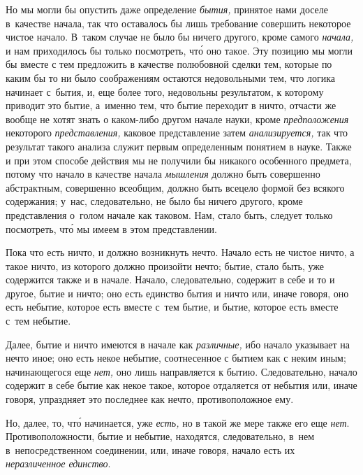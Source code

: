 Но мы могли бы опустить даже определение {\em бытия,} принятое нами доселе
в~качестве начала, так что оставалось бы лишь требование совершить некоторое
чистое начало. В~таком случае не было бы ничего другого, кроме самого
{\em начала,} и нам приходилось бы только посмотреть, чт\'{о} оно такое. Эту
позицию мы могли бы вместе с тем предложить в качестве полюбовной сделки тем,
которые по каким бы то ни было соображениям остаются недовольными тем, что
логика начинает с~бытия, и, еще более того, недовольны результатом, к которому
приводит это бытие, а~именно тем, что бытие переходит в ничто, отчасти же
вообще не хотят знать о каком-либо другом начале науки, кроме
{\em предположения} некоторого {\em представления,} каковое представление затем
{\em анализируется,} так что результат такого анализа служит первым
определенным понятием в науке. Также и при этом способе действия мы не получили
бы никакого особенного предмета, потому что начало в качестве начала
{\em мышления} должно быть совершенно абстрактным, совершенно всеобщим, должно
быть всецело формой без всякого содержания; у~нас, следовательно, не было бы
ничего другого, кроме представления о~голом начале как таковом. Нам, стало
быть, следует только посмотреть, чт\'{о} мы имеем в этом представлении.

Пока что есть ничто, и должно возникнуть нечто. Начало есть не чистое ничто,
а такое ничто, из которого должно произойти нечто; бытие, стало быть, уже
содержится также и в начале. Начало, следовательно, содержит в себе и то и
другое, бытие и ничто; оно есть единство бытия и ничто или, иначе говоря,
оно есть небытие, которое есть вместе с~тем бытие, и бытие, которое есть
вместе с~тем небытие.

Далее, бытие и ничто имеются в начале как {\em различные,} ибо начало указывает
на нечто иное; оно есть некое небытие, соотнесенное с бытием как с неким иным;
начинающегося еще {\em нет,} оно лишь направляется к бытию. Следовательно,
начало содержит в себе бытие как некое такое, которое отдаляется от небытия
или, иначе говоря, упраздняет это последнее как нечто, противоположное ему.

Но, далее, то, чт\'{о} начинается, уже {\em есть,} но в такой же мере также его
еще {\em нет}. Противоположности, бытие и небытие, находятся, следовательно,
в~нем в~непосредственном соединении, или, иначе говоря, начало есть их
{\em неразличенное единство}.

